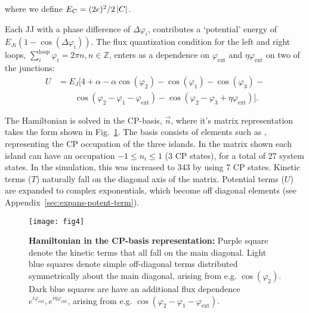 \noindent where we define $ E_{C}={(2e)^{2}}/{2 \left|C\right| } $.

Each  JJ  with   a  phase  difference  of  $\Delta\varphi_{i}$,  contributes   a  `potential'  energy  of
$ E_{Ji}\left(1 - \cos(\Delta\varphi_i)\right) $.  The flux quantization condition for the left and right
loops,  $  \sum_{i}^{\text{loop}} \varphi_i  =  2\pi  n,  n \in  \mathbb{Z}$,  enters  as a  dependence  on
$ \varphi_\text{ext} $ and $ \eta\varphi_\text{ext} $ on two of the junctions:
\begin{equation}\label{eq:potential}
  \begin{aligned}
    U & = E_J\big[4 + \alpha - \alpha\cos(\varphi_{2}) -\cos(\varphi_{1}) -\cos(\varphi_{3}) - \\
    & \qquad \cos(\varphi_{2} - \varphi_{1} - \varphi_{\text{ext}}) - \cos(\varphi_{2} - \varphi_{3} + \eta\varphi_{\text{ext}})\big].
  \end{aligned}
\end{equation}

The Hamiltonian is solved in the CP-basis,  $\vec{n} $, where it's matrix representation takes
the form shown  in Fig.~\ref{fig:matrix_representation}.  The basis consists  of elements such
as , representing the CP occupation  of the three islands.  In the matrix shown
each island can have an  occupation $ -1 \le n_{i} \le 1$ (3 CP states),  for a total of 27 system
states.  In  the simulation, this was  increased to 343 by  using 7 CP states.   Kinetic terms
($ {T}  $) naturally fall on  the diagonal axis  of the matrix.   Potential terms ($ U  $) are
expanded   to    complex   exponentials,   which    become   off   diagonal    elements   (see
Appendix~\ref{sec:expans-potent-term}).

\begin{figure}[ht]
  \centering \texttt{[image: fig4]}
  \caption{\small \textbf{Hamiltonian in the CP-basis representation:} Purple square denote the kinetic terms that all fall on the main diagonal. Light blue squares denote simple off-diagonal terms distributed symmetrically about the main diagonal, arising from e.g. $\cos(\varphi_2)$. Dark blue squares are have an additional flux dependence $e^{i\varphi_{\text{ext}}}, e^{i\eta\varphi_{\text{ext}}}$, arising from e.g. $\cos(\varphi_2-\varphi_1-\varphi_{\text{ext}})$.
    \label{fig:matrix_representation} }
\end{figure}

